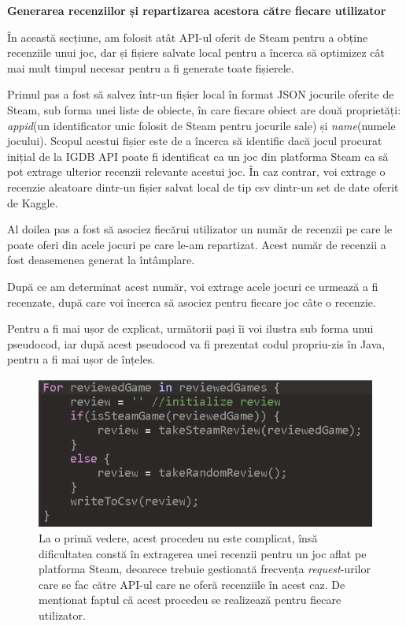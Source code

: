 \documentclass[12pt,a4paper]{report}
\begin{document}
\bigskip
\textbf{Generarea recenziilor și repartizarea acestora către fiecare utilizator}
\bigskip

În această secțiune, am folosit atât API-ul oferit de Steam pentru a obține recenziile unui joc, dar și fișiere salvate local pentru a încerca să optimizez cât mai mult timpul necesar pentru a fi generate toate fișierele.

Primul pas a fost să salvez într-un fișier local în format JSON jocurile oferite de Steam, sub forma unei liste de obiecte, în care fiecare obiect are două proprietăți:  \emph{appid}(un identificator unic folosit de Steam pentru jocurile sale) și \emph{name}(numele jocului). Scopul acestui fișier este de a încerca să identific dacă jocul procurat inițial de la IGDB API poate fi identificat ca un joc din platforma Steam ca să pot extrage ulterior recenzii relevante acestui joc. În caz contrar, voi extrage o recenzie aleatoare dintr-un fișier salvat local de tip csv dintr-un set de date oferit de Kaggle. \cite{17}

Al doilea pas a fost să asociez fiecărui utilizator un număr de recenzii pe care le poate oferi din acele jocuri pe care le-am repartizat. Acest număr de recenzii a fost deasemenea generat la întâmplare.

După ce am determinat acest număr, voi extrage acele jocuri ce urmează a fi recenzate, după care voi încerca să asociez pentru fiecare joc câte o recenzie. 

Pentru a fi mai ușor de explicat, următorii pași îi voi ilustra sub forma unui pseudocod, iar după acest pseudocod va fi prezentat codul propriu-zis în Java, pentru a fi mai ușor de înțeles.

\begin{figure}[H]
\centering
\caption{}
\begin{adjustbox}{max size={\textwidth}{\textheight}}
\includegraphics[scale = 0.8]{exemplu_13_review_code}
\end{adjustbox}
\caption*{La o primă vedere, acest procedeu nu este complicat, însă dificultatea constă în extragerea unei recenzii pentru un joc aflat pe platforma Steam, deoarece trebuie gestionată frecvența \emph{request}-urilor care se fac către API-ul care ne oferă recenziile în acest caz. De menționat faptul că acest procedeu se realizează pentru fiecare utilizator.}
\end{figure}
\end{document}
